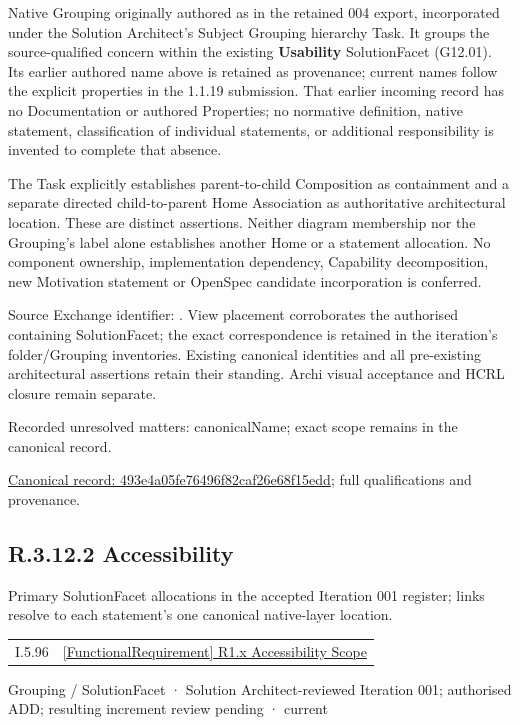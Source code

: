 Native Grouping originally authored as \texttt{} in the retained 004 export,
incorporated under the Solution Architect's Subject Grouping hierarchy Task.
It groups the source-qualified \texttt{} concern within
the existing \textbf{Usability} SolutionFacet (G12.01). Its earlier authored name above is retained as provenance; current names
follow the explicit properties in the 1.1.19 submission.
That earlier incoming record has no Documentation or authored Properties; no normative
definition, native statement, classification of individual statements, or
additional responsibility is invented to complete that absence.



The Task explicitly establishes parent-to-child Composition as containment and
a separate directed child-to-parent Home Association as authoritative architectural
location. These are distinct assertions. Neither diagram membership nor the
Grouping's label alone establishes another Home or a statement allocation.
No component ownership, implementation dependency, Capability decomposition,
new Motivation statement or OpenSpec candidate incorporation is conferred.



Source Exchange identifier: \texttt{}. View placement corroborates
the authorised containing SolutionFacet; the exact correspondence is retained in the
iteration's folder/Grouping inventories. Existing canonical identities and all
pre-existing architectural assertions retain their standing. Archi visual
acceptance and HCRL closure remain separate.


{\small Recorded unresolved matters: canonicalName; exact scope remains in the canonical record.}\par
{\footnotesize \href{../../../../../../../continuum/grouping/493e4a05fe76496f82caf26e68f15edd.md}{Canonical record: 493e4a05fe76496f82caf26e68f15edd}; full qualifications and provenance.}\par
\subsection*{R.3.12.2 Accessibility}
\label{navigation:R.3.12.2}

Primary SolutionFacet allocations in the accepted Iteration 001 register; links resolve to each statement’s one canonical native-layer location.\par
\begin{longtable}{p{.22\linewidth}p{.73\linewidth}}
I.5.96 & \hyperref[element:8369e22bc3414ae49a1987095549ef03]{[FunctionalRequirement] R1.x Accessibility Scope} \\
\end{longtable}
\label{element:f814f4598722425cb3e7f45c32c11c90}
{\small Grouping / SolutionFacet · Solution Architect-reviewed Iteration 001; authorised ADD; resulting increment review pending · current}\par


